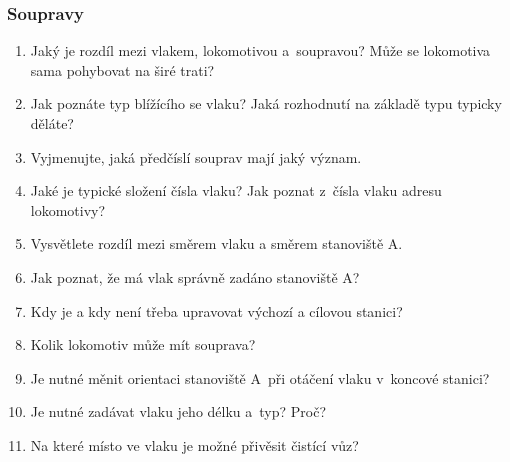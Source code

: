 \documentclass[12pt,a4paper]{article}
\begin{document}
\subsubsection*{Soupravy}
\begin{enumerate}[leftmargin=*]
\item Jaký je rozdíl mezi vlakem, lokomotivou a~soupravou? Může se lokomotiva
sama pohybovat na širé trati?

\item Jak poznáte typ blížícího se vlaku? Jaká rozhodnutí na základě typu
typicky děláte?

\item Vyjmenujte, jaká předčíslí souprav mají jaký význam.

\item Jaké je typické složení čísla vlaku? Jak poznat z~čísla vlaku adresu
lokomotivy?

\item Vysvětlete rozdíl mezi směrem vlaku a směrem stanoviště A.

\item Jak poznat, že má vlak správně zadáno stanoviště A?

\item Kdy je a kdy není třeba upravovat výchozí a cílovou stanici?

\item Kolik lokomotiv může mít souprava?

\item Je nutné měnit orientaci stanoviště A~při otáčení vlaku v~koncové
stanici?

\item Je nutné zadávat vlaku jeho délku a~typ? Proč?

\item Na které místo ve vlaku je možné přivěsit čistící vůz?

\end{enumerate}
\end{document}
